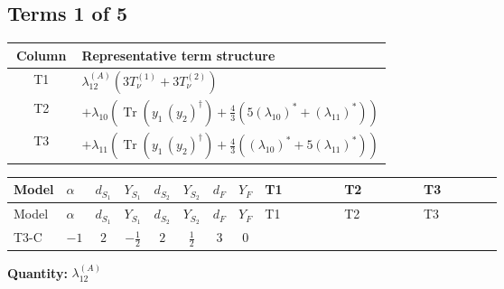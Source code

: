 \documentclass[8pt]{article}
\begin{document}
\begin{landscape}
\subsection*{Terms 1 of 5}
\begin{center}
\begin{tabular}{@{}c >{\raggedright\arraybackslash}p{0.82\linewidth}@{}}
\toprule
Column & Representative term structure \\
\midrule
T1 & \(\displaystyle {\lambda_{12}^{(A)}} (3 T_{\nu}^{(1)}+3 T_{\nu}^{(2)})\) \\
\midrule
T2 & \(\displaystyle +{\lambda_{10}} \left(\operatorname{Tr}\!\left({y_1}\,\left({y_2}\right)^{\dagger}\right)+\frac{4}{3} (5 \left({\lambda_{10}}\right)^{*}+\left({\lambda_{11}}\right)^{*})\right)\) \\
\midrule
T3 & \(\displaystyle +{\lambda_{11}} \left(\operatorname{Tr}\!\left({y_1}\,\left({y_2}\right)^{\dagger}\right)+\frac{4}{3} (\left({\lambda_{10}}\right)^{*}+5 \left({\lambda_{11}}\right)^{*})\right)\) \\
\midrule
\bottomrule
\end{tabular}
\end{center}
\smallskip
\tiny
\begin{longtable}{@{}llcccccc >{\raggedright\arraybackslash}p{0.21\linewidth} >{\raggedright\arraybackslash}p{0.21\linewidth} >{\raggedright\arraybackslash}p{0.21\linewidth}@{}}
\toprule
Model & $\alpha$ & $d_{S_1}$ & $Y_{S_1}$ & $d_{S_2}$ & $Y_{S_2}$ & $d_F$ & $Y_F$ & T1 & T2 & T3 \\
\midrule
\endfirsthead
\toprule
Model & $\alpha$ & $d_{S_1}$ & $Y_{S_1}$ & $d_{S_2}$ & $Y_{S_2}$ & $d_F$ & $Y_F$ & T1 & T2 & T3 \\
\midrule
\endhead
T3-C & $-1$ & $2$ & $-\frac{1}{2}$ & $2$ & $\frac{1}{2}$ & $3$ & $0$ & \scriptsize\adjustbox{max width=\linewidth}{$\begin{gathered} {\lambda_{12}^{(A)}} (3 T_{\nu}^{(1)}+3 T_{\nu}^{(2)})\end{gathered}$} & \scriptsize\adjustbox{max width=\linewidth}{$\begin{gathered} +{\lambda_{10}} \left(\operatorname{Tr}\!\left({y_1}\,\left({y_2}\right)^{\dagger}\right)+\frac{4}{3} (5 \left({\lambda_{10}}\right)^{*}+\left({\lambda_{11}}\right)^{*})\right)\end{gathered}$} & \scriptsize\adjustbox{max width=\linewidth}{$\begin{gathered} +{\lambda_{11}} \left(\operatorname{Tr}\!\left({y_1}\,\left({y_2}\right)^{\dagger}\right)+\frac{4}{3} (\left({\lambda_{10}}\right)^{*}+5 \left({\lambda_{11}}\right)^{*})\right)\end{gathered}$} \\
\midrule
\bottomrule
\end{longtable}
\clearpage
\noindent\textbf{Quantity: }$\lambda_{12}^{(A)}$\par\smallskip

\end{landscape}
\end{document}
